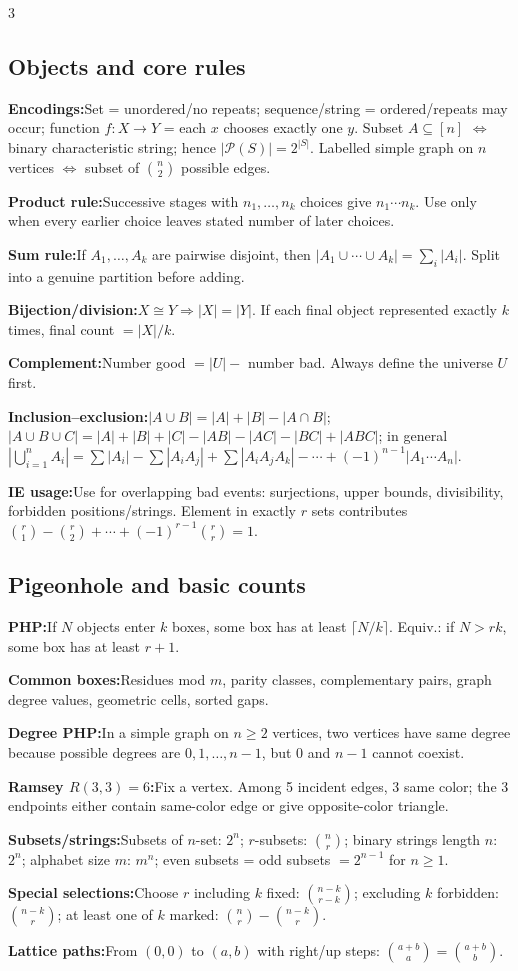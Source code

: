 \documentclass[10pt]{article}
\newcommand{\Pow}{\mathcal{P}}
\newenvironment{cheatitems}{\par\vspace{-1pt}}{\par\vspace{-1pt}}
\newcommand{\cheatrow}[2]{\par\noindent\textbf{#1:}\enspace #2\par}
\begin{document}
\begin{multicols}{3}
\subsection*{Objects and core rules}
\begin{cheatitems}
\cheatrow{Encodings}{Set = unordered/no repeats; sequence/string = ordered/repeats may occur; function $f:X\to Y$ = each $x$ chooses exactly one $y$. Subset $A\subseteq[n]$ $\Leftrightarrow$ binary characteristic string; hence $|\Pow(S)|=2^{|S|}$. Labelled simple graph on $n$ vertices $\Leftrightarrow$ subset of $\binom n2$ possible edges.}
\cheatrow{Product rule}{Successive stages with $n_1,\ldots,n_k$ choices give $n_1\cdots n_k$. Use only when every earlier choice leaves stated number of later choices.}
\cheatrow{Sum rule}{If $A_1,\ldots,A_k$ are pairwise disjoint, then $|A_1\cup\cdots\cup A_k|=\sum_i|A_i|$. Split into a genuine partition before adding.}
\cheatrow{Bijection/division}{$X\cong Y\Rightarrow |X|=|Y|$. If each final object represented exactly $k$ times, final count $=|X|/k$.}
\cheatrow{Complement}{Number good $=|U|-$ number bad. Always define the universe $U$ first.}
\cheatrow{Inclusion--exclusion}{$|A\cup B|=|A|+|B|-|A\cap B|$; $|A\cup B\cup C|=|A|+|B|+|C|-|AB|-|AC|-|BC|+|ABC|$; in general $|\bigcup_{i=1}^n A_i|=\sum|A_i|-\sum|A_iA_j|+\sum|A_iA_jA_k|-\cdots+(-1)^{n-1}|A_1\cdots A_n|$.}
\cheatrow{IE usage}{Use for overlapping bad events: surjections, upper bounds, divisibility, forbidden positions/strings. Element in exactly $r$ sets contributes $\binom r1-\binom r2+\cdots+(-1)^{r-1}\binom rr=1$.}
\end{cheatitems}

\subsection*{Pigeonhole and basic counts}
\begin{cheatitems}
\cheatrow{PHP}{If $N$ objects enter $k$ boxes, some box has at least $\lceil N/k\rceil$. Equiv.: if $N>rk$, some box has at least $r+1$.}
\cheatrow{Common boxes}{Residues mod $m$, parity classes, complementary pairs, graph degree values, geometric cells, sorted gaps.}
\cheatrow{Degree PHP}{In a simple graph on $n\ge2$ vertices, two vertices have same degree because possible degrees are $0,1,\ldots,n-1$, but $0$ and $n-1$ cannot coexist.}
\cheatrow{Ramsey $R(3,3)=6$}{Fix a vertex. Among 5 incident edges, 3 same color; the 3 endpoints either contain same-color edge or give opposite-color triangle.}
\cheatrow{Subsets/strings}{Subsets of $n$-set: $2^n$; $r$-subsets: $\binom nr$; binary strings length $n$: $2^n$; alphabet size $m$: $m^n$; even subsets = odd subsets $=2^{n-1}$ for $n\ge1$.}
\cheatrow{Special selections}{Choose $r$ including $k$ fixed: $\binom{n-k}{r-k}$; excluding $k$ forbidden: $\binom{n-k}{r}$; at least one of $k$ marked: $\binom nr-\binom{n-k}{r}$.}
\cheatrow{Lattice paths}{From $(0,0)$ to $(a,b)$ with right/up steps: $\binom{a+b}{a}=\binom{a+b}{b}$.}
\end{cheatitems}


\end{multicols}
\end{document}
